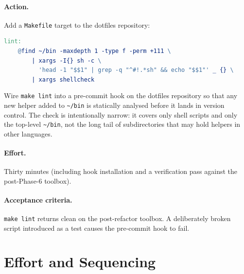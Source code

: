 \documentclass[11pt,letterpaper]{scrartcl}
\begin{document}
\paragraph{Action.} Add a \texttt{Makefile} target to the
dotfiles repository:

\begin{lstlisting}[language=make]
lint:
	@find ~/bin -maxdepth 1 -type f -perm +111 \
	    | xargs -I{} sh -c \
	      'head -1 "$$1" | grep -q "^#!.*sh" && echo "$$1"' _ {} \
	    | xargs shellcheck
\end{lstlisting}

Wire \texttt{make lint} into a pre-commit hook on the dotfiles
repository so that any new helper added to
\texttt{\textasciitilde/bin} is statically analysed before it
lands in version control. The check is intentionally narrow: it
covers only shell scripts and only the top-level
\texttt{\textasciitilde/bin}, not the long tail of subdirectories
that may hold helpers in other languages.

\paragraph{Effort.} Thirty minutes (including hook installation
and a verification pass against the post-Phase-6 toolbox).

\paragraph{Acceptance criteria.} \texttt{make lint} returns clean
on the post-refactor toolbox. A deliberately broken script
introduced as a test causes the pre-commit hook to fail.

\section{Effort and Sequencing}
\end{document}
